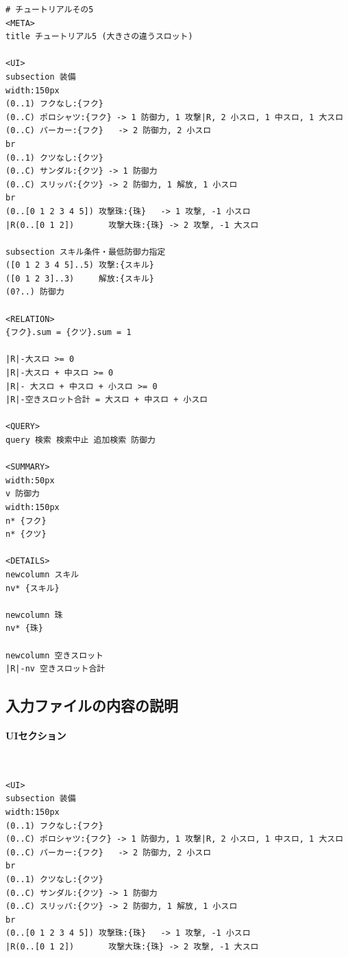 \documentclass[dvipdfmx]{jsarticle}
\begin{document}
{\footnotesize\begin{mdframed}\begin{Verbatim}[commandchars=|<>]
# チュートリアルその5
<META>
title チュートリアル5 (大きさの違うスロット)

<UI>
subsection 装備
width:150px
(0..1) フクなし:{フク}
(0..C) ポロシャツ:{フク} -> 1 防御力, 1 攻撃|R, 2 小スロ, 1 中スロ, 1 大スロ
(0..C) パーカー:{フク}   -> 2 防御力, 2 小スロ
br
(0..1) クツなし:{クツ}
(0..C) サンダル:{クツ} -> 1 防御力
(0..C) スリッパ:{クツ} -> 2 防御力, 1 解放, 1 小スロ
br
(0..[0 1 2 3 4 5]) 攻撃珠:{珠}   -> 1 攻撃, -1 小スロ
|R(0..[0 1 2])       攻撃大珠:{珠} -> 2 攻撃, -1 大スロ

subsection スキル条件・最低防御力指定
([0 1 2 3 4 5]..5) 攻撃:{スキル}
([0 1 2 3]..3)     解放:{スキル}
(0?..) 防御力

<RELATION>
{フク}.sum = {クツ}.sum = 1

|R|-大スロ >= 0
|R|-大スロ + 中スロ >= 0
|R|- 大スロ + 中スロ + 小スロ >= 0
|R|-空きスロット合計 = 大スロ + 中スロ + 小スロ

<QUERY>
query 検索 検索中止 追加検索 防御力

<SUMMARY>
width:50px
v 防御力
width:150px
n* {フク}
n* {クツ}

<DETAILS>
newcolumn スキル
nv* {スキル}

newcolumn 珠
nv* {珠}

newcolumn 空きスロット
|R|-nv 空きスロット合計
\end{Verbatim}
\end{mdframed}}

\subsection{入力ファイルの内容の説明}

\paragraph{UIセクション}~\medskip
{\footnotesize\begin{mdframed}\begin{Verbatim}[commandchars=|<>]
<UI>
subsection 装備
width:150px
(0..1) フクなし:{フク}
(0..C) ポロシャツ:{フク} -> 1 防御力, 1 攻撃|R, 2 小スロ, 1 中スロ, 1 大スロ
(0..C) パーカー:{フク}   -> 2 防御力, 2 小スロ
br
(0..1) クツなし:{クツ}
(0..C) サンダル:{クツ} -> 1 防御力
(0..C) スリッパ:{クツ} -> 2 防御力, 1 解放, 1 小スロ
br
(0..[0 1 2 3 4 5]) 攻撃珠:{珠}   -> 1 攻撃, -1 小スロ
|R(0..[0 1 2])       攻撃大珠:{珠} -> 2 攻撃, -1 大スロ
\end{Verbatim}
\end{mdframed}}
\medskip
\end{document}
